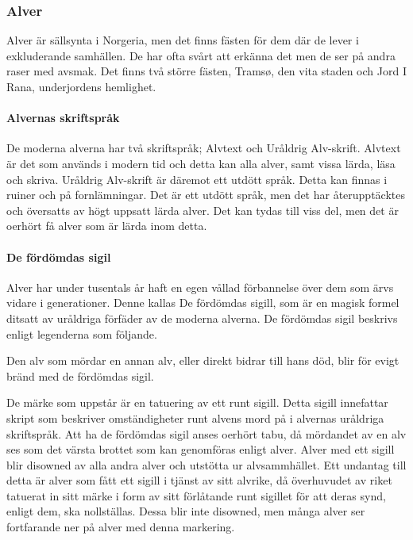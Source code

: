 \subsubsection{Alver}
Alver är sällsynta i Norgeria, men det finns fästen för dem där de lever i exkluderande samhällen. De har ofta svårt att erkänna det men de ser på andra raser med avsmak. Det finns två större fästen, Tramsø, den vita staden och Jord I Rana, underjordens hemlighet. 
%
\paragraph{Alvernas skriftspråk}
De moderna alverna har två skriftspråk; Alvtext och Uråldrig Alv-skrift. Alvtext är det som används i modern tid och detta kan alla alver, samt vissa lärda, läsa och skriva. Uråldrig Alv-skrift är däremot ett utdött språk. Detta kan finnas i ruiner och på fornlämningar. Det är ett utdött språk, men det har återupptäcktes och översatts av högt uppsatt lärda alver. Det kan tydas till viss del, men det är oerhört få alver som är lärda inom detta.
%
\paragraph{De fördömdas sigil}
Alver har under tusentals år haft en egen vållad förbannelse över dem som ärvs vidare i generationer. Denne kallas De fördömdas sigill, som är en magisk formel ditsatt av uråldriga förfäder av de moderna alverna. De fördömdas sigil beskrivs enligt legenderna som följande.
%
\begin{displayquote}
Den alv som mördar en annan alv, eller direkt bidrar till hans död, blir för evigt bränd med de fördömdas sigil.  
\end{displayquote}
%
De märke som uppstår är en tatuering av ett runt sigill. Detta sigill innefattar skript som beskriver omständigheter runt alvens mord på i alvernas uråldriga skriftspråk.
%
Att ha de fördömdas sigil anses oerhört tabu, då mördandet av en alv ses som det värsta brottet som kan genomföras enligt alver. Alver med ett sigill blir disowned av alla andra alver och utstötta ur alvsammhället. 
%
Ett undantag till detta är alver som fått ett sigill i tjänst av sitt alvrike, då överhuvudet av riket tatuerat in sitt märke i form av sitt förlåtande runt sigillet för att deras synd, enligt dem, ska nollställas. Dessa blir inte disowned, men många alver ser fortfarande ner på alver med denna markering. 

